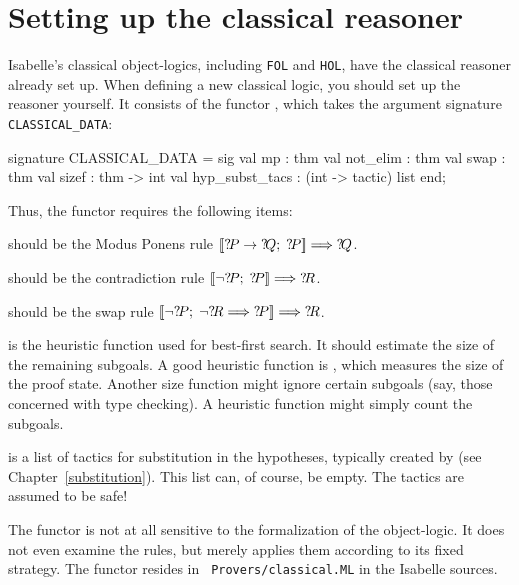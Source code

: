 \section{Setting up the classical reasoner}
Isabelle's classical object-logics, including {\tt FOL} and {\tt HOL}, have
the classical reasoner already set up.  When defining a new classical logic,
you should set up the reasoner yourself.  It consists of the \ML{} functor
, which takes the argument
signature {\tt CLASSICAL_DATA}:
\begin{ttbox} 
signature CLASSICAL_DATA =
  sig
  val mp             : thm
  val not_elim       : thm
  val swap           : thm
  val sizef          : thm -> int
  val hyp_subst_tacs : (int -> tactic) list
  end;
\end{ttbox}
Thus, the functor requires the following items:
\begin{ttdescription}
\item[\tdxbold{mp}] should be the Modus Ponens rule
$\mathopen{[\![}{?\!P}\rightarrow{?\!Q};\; {?\!P}\mathclose{]\!]} \Longrightarrow {?\!Q}$.

\item[\tdxbold{not_elim}] should be the contradiction rule
$\mathopen{[\![}\neg{?\!P};\; {?\!P}\mathclose{]\!]} \Longrightarrow {?\!R}$.

\item[\tdxbold{swap}] should be the swap rule
$\mathopen{[\![}\neg {?\!P}; \; \neg {?\!R}\Longrightarrow {?\!P}\mathclose{]\!]} \Longrightarrow {?\!R}$.

\item[\ttindexbold{sizef}] is the heuristic function used for best-first
search.  It should estimate the size of the remaining subgoals.  A good
heuristic function is , which measures the size of the
proof state.  Another size function might ignore certain subgoals (say,
those concerned with type checking).  A heuristic function might simply
count the subgoals.

\item[\ttindexbold{hyp_subst_tacs}] is a list of tactics for substitution in
the hypotheses, typically created by  (see
Chapter~\ref{substitution}).  This list can, of course, be empty.  The
tactics are assumed to be safe!
\end{ttdescription}
The functor is not at all sensitive to the formalization of the
object-logic.  It does not even examine the rules, but merely applies
them according to its fixed strategy.  The functor resides in {\tt
  Provers/classical.ML} in the Isabelle sources.

